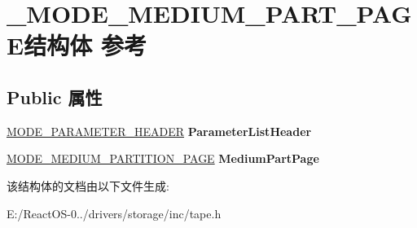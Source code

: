 \hypertarget{struct___m_o_d_e___m_e_d_i_u_m___p_a_r_t___p_a_g_e}{}\section{\+\_\+\+M\+O\+D\+E\+\_\+\+M\+E\+D\+I\+U\+M\+\_\+\+P\+A\+R\+T\+\_\+\+P\+A\+G\+E结构体 参考}
\label{struct___m_o_d_e___m_e_d_i_u_m___p_a_r_t___p_a_g_e}
\subsection*{Public 属性}
\begin{DoxyCompactItemize}
\item 
\mbox{\label{struct___m_o_d_e___m_e_d_i_u_m___p_a_r_t___p_a_g_e_afb766677648c93753843ead0a26e5172}} 
\hyperlink{struct___m_o_d_e___p_a_r_a_m_e_t_e_r___h_e_a_d_e_r}{M\+O\+D\+E\+\_\+\+P\+A\+R\+A\+M\+E\+T\+E\+R\+\_\+\+H\+E\+A\+D\+ER} {\bfseries Parameter\+List\+Header}
\item 
\mbox{\label{struct___m_o_d_e___m_e_d_i_u_m___p_a_r_t___p_a_g_e_a1cc2141cabe5633eb933aa59700ad2fc}} 
\hyperlink{struct___m_o_d_e___m_e_d_i_u_m___p_a_r_t_i_t_i_o_n___p_a_g_e}{M\+O\+D\+E\+\_\+\+M\+E\+D\+I\+U\+M\+\_\+\+P\+A\+R\+T\+I\+T\+I\+O\+N\+\_\+\+P\+A\+GE} {\bfseries Medium\+Part\+Page}
\end{DoxyCompactItemize}


该结构体的文档由以下文件生成\+:\begin{DoxyCompactItemize}
\item 
E\+:/\+React\+O\+S-\/0../drivers/storage/inc/tape.\+h\end{DoxyCompactItemize}
